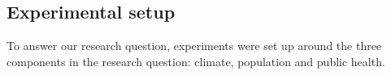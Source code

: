     

    
\subsection{Experimental setup}
  
To answer our research question, experiments were set up around the three components in the research question: climate, population and public health. 


